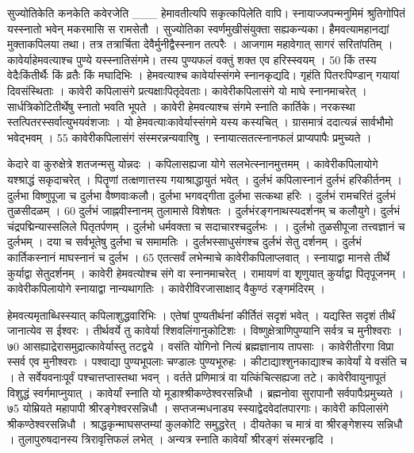 सुज्योतिकेति कनकेति कवेरजेति
___ हेमावतीत्यपि सकृत्कपिलेति वापि।
 स्नायाज्जपन्मनुमिमं श्रुतिगोपितं
यस्स्नातो भवेन् मकरमासि स रामसेतौ ।
 सुज्योतिका स्वर्णमुखीसंयुक्ता सह्यकन्यका।
 हैमवत्यामहानद्यां मुक्ताकपिलया तथा।
 तत्र तत्रार्चिता देवैर्मुनीद्वैस्स्नान तत्परैः ।
 आजगाम महावेगात् सागरं सरितांपतिम् ।
 कावेर्याहेमवत्याश्च पुण्ये यस्स्नातिसंगमे।
 तस्य पुण्यफलं वक्तुं शक्त एव हरिस्स्वयम् ।
 50 किं तस्य वेदैःकिंतीर्थैः किं व्रतैः किं मघादिभिः ।
 हेमवत्याश्च कावेर्यास्संगमे स्नानकृद्यदि।
 गृहंति पितरःपिण्डान् गयायां दिवसंस्थिताः ।
 कावेरी कपिलासंगे प्रत्यक्षाःपितृदेवताः।
 कावेरीकपिलासंगे यो माघे स्नानमाचरेत् ।
 सार्धत्रिकोटितीर्थेषु स्नातो भवति भूपते ।
 कावेरी हेमवत्याश्च संगमे स्नाति कार्तिके।
 नरकस्था स्तत्पितरस्सर्वात्युभयवंशजाः ।
 यो हेमवत्याःकावेर्यास्संगमे यस्य कस्यचित् ।
 ग्रासमात्रं ददात्यन्नं सार्वभौमो भवेद्भवम् ।
 55 कावेरीकपिलासंगं संस्मरन्नन्यवारिषु ।
 स्नायात्सतत्स्नानफलं प्राप्यपापैः प्रमुच्यते ।
 
केदारे वा कुरुक्षेत्रे शतजन्मसु योन्नदः ।
 कपिलासह्यजा योगे सलभेत्स्नानमुत्तमम् ।
 कावेरीकपिलायोगे यश्श्राद्धं सकृदाचरेत् ।
 पितॄणां तत्क्षणात्तस्य गयाश्राद्धायुतं भवेत् ।
 दुर्लभं कपिलास्नानं दुर्लभं हरिकीर्तनम् ।
 दुर्लभा विष्णुपूजा च दुर्लभा वैष्णवाःकलौ।
 दुर्लभा भगवद्गीता दुर्लभा सत्कथा हरिः ।
 दुर्लभं रामचरितं दुर्लभं तुळसीदळम् ।
 60 दुर्लभं जाह्नवीस्नानम् तुलामासे विशेषतः ।
 दुर्लभंरङ्गनाथस्यदर्शनम् च कलौयुगे।
 दुर्लभं चंद्रपद्मिन्यास्सलिले पितृतर्पणम् ।
 दुर्लभो धर्मवक्ता च सदाचारश्चदुर्लभः ।
 ।
 दुर्लभो तुळसीपूजा तत्त्वज्ञानं च दुर्लभम् ।
 दया च सर्वभूतेषु दुर्लभा च समामतिः ।
 दुर्लभस्साधुसंगश्च दुर्लभं सेतु दर्शनम् ।
 दुर्लभं कार्तिकस्नानं माघस्नानं च दुर्लभ ।
 65 एतत्सर्वं लभेन्माचे कावेरीकपिलाप्लवात् ।
 स्नायाद्वा मानसे तीर्थे कुर्याद्वा सेतुदर्शनम् ।
 कावेरी हेमवत्योश्च संगे वा स्नानमाचरेत् ।
 रामायणं वा शृणुयात् कुर्याद्वा पितृपूजनम् ।
 कावेरीकपिलायोगे स्नायाद्वा नान्यथागतिः ।
 कावेरीविरजासाक्षाद् वैकुण्ठं रङ्गमंदिरम् ।
 
हेमवत्यमृताब्धिस्स्यात् कपिलाशुद्धवारिभिः ।
 एतेषां पुण्यतीर्थनां कीर्तितं सदृशं भवेत् ।
 यद्यस्ति सदृशं तीर्थं जानात्येव स ईश्वरः ।
 तीर्थवर्ये तु कावेर्या श्शिवलिंगानुकोटिशः ।
 विष्णुक्षेत्राणिपुण्यानि सर्वत्र च मुनीश्वराः ।
 ७0 आसह्याद्रेरासमुद्रात्कावेर्यास्तु तटद्वये ।
 वसंति योगिनो नित्यं ब्रह्मज्ञानाय तापसाः ।
 कावेरीतीरगा विप्रा स्सर्व एव मुनीश्वराः ।
 पश्वाद्या पुण्यभूपलाः चण्डालः पुण्यभूरुहः ।
 कीटाद्याश्शुनकाद्याश्च कावेर्यां ये वसंति च ।
 ते सर्वेयवनाःपूर्वं पश्चात्तप्तास्तथा भवन् ।
 वर्तते प्रणिमात्रं वा यत्किंचित्सह्यजा तटे।
 कावेरीवायुनापूतं विशुद्धं स्वर्गमाप्नुयात् ।
 कावेर्यां स्नाति यो मूडाश्श्रीकण्ठेश्वरसन्निधौ ।
 ब्रह्मनोवा सुरापानौ सर्वपापैःप्रमुच्यते ।
 ७5 योम्रियते महापापी श्रीरङ्गेश्वरसन्निधौ ।
 सप्तजन्मधनाड्य स्स्याद्वेदवेदांतपारगाः।
 कावेरी कपिलासंगे श्रीकण्ठेश्वरसन्निधौ ।
 श्राद्धकृन्माघसप्तम्यां कुलकोटि समुद्धरेत् ।
 दीयतेका च मात्रं वा श्रीरङ्गेशस्य सन्निधौ ।
 तुलापुरुषदानस्य त्रिरावृत्तिफलं लभेत् ।
 अन्यत्र स्नाति कावेर्यां श्रीरङ्गं संस्मरन्हृदि ।
 
